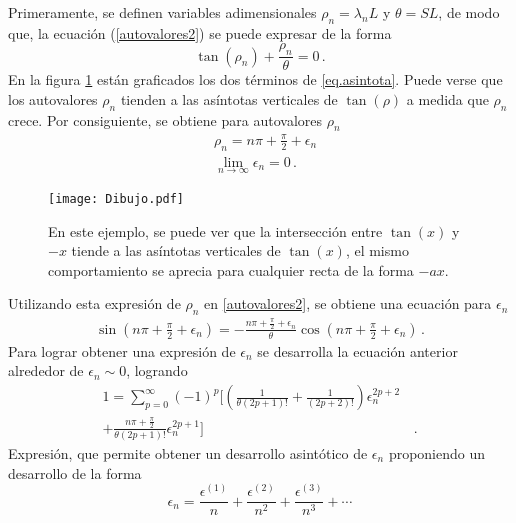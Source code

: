 Primeramente, se definen  variables adimensionales $\rho _n = \lambda _n L $ y $\theta = S L $, de modo que, la ecuación (\ref{autovalores2}) se puede expresar de la forma
\begin{equation}
    \tan (\rho _n) + \frac{\rho _n}{\theta} = 0
    \, .
    \label{eq.asintota}
\end{equation}
En la figura \ref{fig:Dibujo1} están graficados los dos términos de \eqref{eq.asintota}. Puede verse que los autovalores $\rho _n$ tienden a las asíntotas verticales de $ \tan ( \rho ) $ a medida que $\rho _n$ crece. Por consiguiente, se obtiene para  autovalores $\rho _n$ 
\begin{align}
    & \rho _n = n \pi + \frac{\pi}{2} + \epsilon _n 
\label{eq.mu}    
\\[5pt]
\nonumber
    & \lim \limits_{ n \rightarrow \infty} \epsilon _n = 0
\, .
\end{align}
\begin{figure}
    \centering
    \texttt{[image: Dibujo.pdf]}
    \caption{En este ejemplo, se puede ver que la intersección entre $ \tan(x)$ y $-x$ tiende a las asíntotas verticales de $\tan (x) $, el mismo comportamiento se aprecia para cualquier recta de la forma $- a x$.}
    \label{fig:Dibujo1}
\end{figure}
Utilizando esta expresión de $\rho _n$ en  \eqref{autovalores2}, se obtiene una ecuación para $\epsilon _n$
\begin{equation}
\begin{aligned}
    \sin \left( n \pi + \frac{\pi}{2} + \epsilon _n \right) = -
    \frac{n \pi + \frac{\pi}{2} + \epsilon _n}{\theta} \cos \left( n \pi + \frac{\pi}{2} + \epsilon _n\right)
    \, .
\end{aligned}
\end{equation}
Para lograr obtener una expresión de $\epsilon _n$ se desarrolla la ecuación anterior alrededor de $\epsilon  _n \sim 0$, logrando
\begin{align}
\nonumber
    1 =     
    \sum _{p=0} ^{\infty} (-1) ^p    
    \Bigg[
   	\left( \frac{1}{\theta (2p+1)!  } + \frac{1}{(2p+2)!} \right) 			\epsilon _n ^{2p+2 } 
&   	
\\
\label{igualdad epsilon}
  	+ \frac{n \pi + \frac{\pi}{2}}{\theta (2p+1)! }   \epsilon _n ^{2p
  	+1}	\Bigg]
& 
  	\, .
\end{align}
Expresión, que permite obtener un desarrollo asintótico de $\epsilon _n$  proponiendo un desarrollo de la forma
\begin{equation}
\label{eq.epsilon}
    \epsilon _n = 
    \frac{\epsilon ^{(1)}}{n}  + 
    \frac{\epsilon ^{(2)}}{n ^2}  + 
    \frac{\epsilon ^{(3)}}{n ^3}  + \dotsb
\end{equation}
